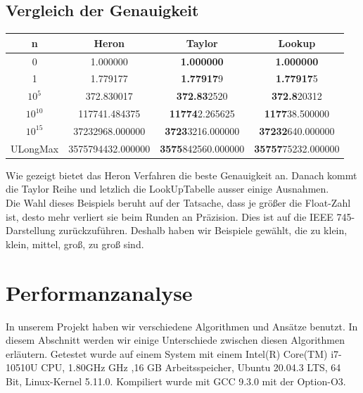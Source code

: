\documentclass[course=erap]{aspdoc}
\begin{document}
\subsection{Vergleich der Genauigkeit}
\begin{table}[h!]
    \centering
    \begin{tabular}{|| c c c c ||}
        \hline
        n         & Heron             & Taylor                     & Lookup                     \\ [2ex]
        \hline\hline
        0         & 1.000000          & \textbf{1.000000}          & \textbf{1.000000}          \\
        1         & 1.779177          & \textbf{1.77917}9          & \textbf{1.77917}5          \\
        $10^5$    & 372.830017        & \textbf{372.83}2520        & \textbf{372.8}20312        \\
        $10^{10}$ & 117741.484375     & \textbf{11774}2.265625     & \textbf{1177}38.500000     \\
        $10^{15}$ & 37232968.000000   & \textbf{3723}3216.000000   & \textbf{37232}640.000000   \\
        ULongMax  & 3575794432.000000 & \textbf{3575}842560.000000 & \textbf{35757}75232.000000 \\
        [2ex]

        \hline
    \end{tabular}
\end{table}
Wie gezeigt bietet das Heron Verfahren die beste Genauigkeit an. Danach kommt die Taylor Reihe
und letzlich die LookUpTabelle ausser einige Ausnahmen.\\
Die Wahl dieses Beispiels beruht auf der Tatsache, dass je größer die Float-Zahl ist, desto mehr verliert sie beim Runden an Präzision. Dies ist auf die IEEE 745-Darstellung zurückzuführen. Deshalb haben wir Beispiele gewählt, die zu klein, klein, mittel, groß, zu groß sind.

\section{Performanzanalyse}
In unserem Projekt haben wir verschiedene Algorithmen und Ansätze benutzt. In diesem
Abschnitt werden wir einige Unterschiede zwischen diesen Algorithmen erläutern.
Getestet wurde auf einem System mit einem Intel(R) Core(TM) i7-10510U CPU, 1.80GHz GHz ,16 GB
Arbeitsspeicher, Ubuntu 20.04.3 LTS, 64 Bit, Linux-Kernel 5.11.0. Kompiliert wurde mit GCC
9.3.0 mit der Option-O3.
\end{document}
